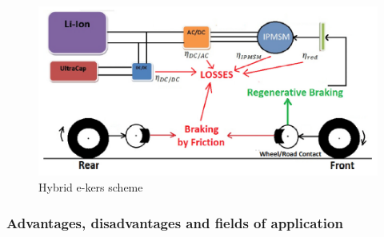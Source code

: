 \documentclass[11pt]{article}
\begin{document}
\begin{figure}[H]
	\centering
	\includegraphics[width=.6\textwidth]{Images/Electric_KERS_powerflow.PNG}
	\caption{Hybrid e-kers scheme}
	\label{ekersschemepowerflow}
\end{figure}


\subsubsection{Advantages, disadvantages and fields of application}
\end{document}
